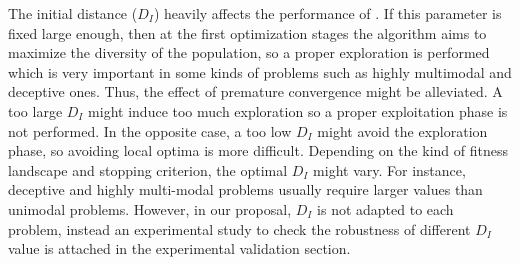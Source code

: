 The initial distance ($D_I$) heavily affects the performance of \DEEDM{}.
%
If this parameter is fixed large enough, then at the first optimization stages the algorithm aims to maximize the diversity of the population, 
so a proper exploration is performed which is very important in some kinds of problems such as highly multimodal and deceptive ones.
%
Thus, the effect of premature convergence might be alleviated.
%
A too large $D_I$ might induce too much exploration so a proper exploitation phase is not performed.
%
In the opposite case, a too low $D_I$ might avoid the exploration phase, so avoiding local optima is more difficult.
%
Depending on the kind of fitness landscape and stopping criterion, the optimal $D_I$ might vary.
%
For instance, deceptive and highly multi-modal problems usually require larger values than unimodal problems.
%
However, in our proposal, $D_I$ is not adapted to each problem, instead an experimental study to check the robustness
of different $D_I$ value is attached in the experimental validation section. 
%
%
%
%
%
%
%
%

